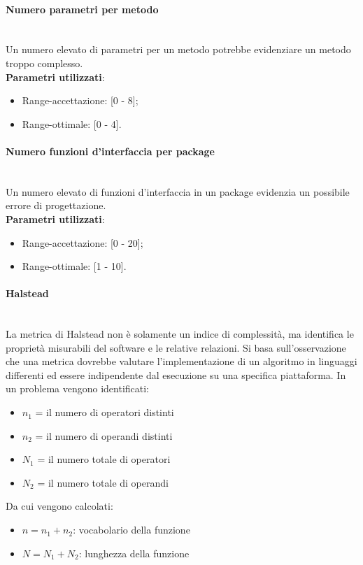 			
			\paragraph{Numero parametri per metodo}\mbox{} \\
				
			Un numero elevato di parametri per un metodo potrebbe evidenziare un metodo troppo complesso.\\
			\textbf{Parametri utilizzati}:
			\begin{itemize}
				\item Range-accettazione: [0 - 8];
				\item Range-ottimale: [0 - 4].
			\end{itemize}
			
			
			\paragraph{Numero funzioni d'interfaccia per package}\mbox{} \\
				
			Un numero elevato di funzioni d'interfaccia in un package evidenzia un possibile errore di progettazione.\\
			\textbf{Parametri utilizzati}:
			\begin{itemize}
				\item Range-accettazione: [0 - 20];
				\item Range-ottimale: [1 - 10].
			\end{itemize}

			
			\paragraph{Halstead}\mbox{} \\
			
			La metrica di Halstead non è solamente un indice di complessità, ma identifica le proprietà misurabili del software e le relative relazioni.
			Si basa sull'osservazione che una metrica dovrebbe valutare l'implementazione di un algoritmo in linguaggi differenti ed essere indipendente dal esecuzione su una specifica piattaforma.
			In un problema vengono identificati:
			\begin{itemize}
				\item $n_1$ = il numero di operatori distinti
				\item $n_2$ = il numero di operandi distinti
				\item $N_1$ = il numero totale di operatori
				\item $N_2$ = il numero totale di operandi
			\end{itemize}
			Da cui vengono calcolati:
				\begin{itemize}
				\item $n = n_1 + n_2$: vocabolario della funzione
				\item $N = N_1 + N_2$: lunghezza della funzione
			\end{itemize}
			
